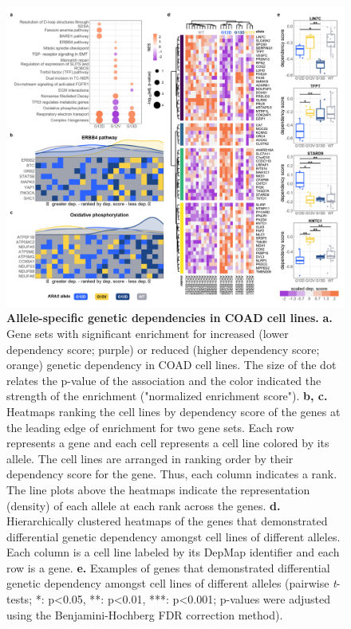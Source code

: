 \begin{figure}[t]
\centering
\includegraphics[width=180mm]{figures/aim1/Fig_4_mod.jpg}
\caption{
\textbf{Allele-specific genetic dependencies in COAD cell lines.}
\textbf{a.} Gene sets with significant enrichment for increased (lower dependency score; purple) or reduced (higher dependency score; orange) genetic dependency in COAD cell lines. The size of the dot relates the p-value of the association and the color indicated the strength of the enrichment ("normalized enrichment score").
\textbf{b, c.} Heatmaps ranking the cell lines by dependency score of the genes at the leading edge of enrichment for two gene sets. Each row represents a gene and each cell represents a cell line colored by its \KRAS{} allele. The cell lines are arranged in ranking order by their dependency score for the gene. Thus, each column indicates a rank. The line plots above the heatmaps indicate the representation (density) of each \KRAS{} allele at each rank across the genes.
\textbf{d.} Hierarchically clustered heatmaps of the genes that demonstrated differential genetic dependency amongst cell lines of different \KRAS{} alleles. Each column is a cell line labeled by its DepMap identifier and each row is a gene.
\textbf{e.} Examples of genes that demonstrated differential genetic dependency amongst cell lines of different \KRAS{} alleles (pairwise \emph{t}-tests; *: p<0.05, **: p<0.01, ***: p<0.001; p-values were adjusted using the Benjamini-Hochberg FDR correction method).
}
\label{fig:genetic-dependency}
\end{figure}